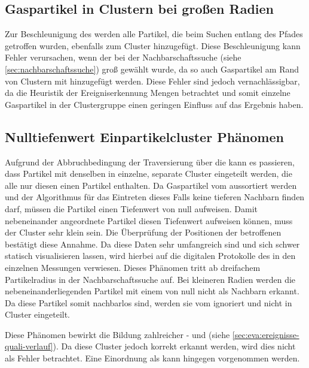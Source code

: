 \subsection*{Gaspartikel in Clustern bei großen Radien}

Zur Beschleunigung des \CFD werden alle Partikel, die beim Suchen entlang des Pfades getroffen wurden, ebenfalls zum Cluster hinzugefügt. Diese Beschleunigung kann Fehler verursachen, wenn der  bei der Nachbarschaftssuche (siehe \autoref{sec:nachbarschaftssuche}) groß gewählt wurde, da so auch Gaspartikel am Rand von Clustern mit hinzugefügt werden. Diese Fehler sind jedoch vernachlässigbar, da die Heuristik der Ereigniserkennung Mengen betrachtet und somit einzelne Gaspartikel in der Clustergruppe einen geringen Einfluss auf das Ergebnis haben.

\subsection*{Nulltiefenwert Einpartikelcluster Phänomen}\label{sec:nulltiefenwert-einpartikel-cluster} %

Aufgrund der Abbruchbedingung der Traversierung über die  kann es passieren, dass Partikel mit denselben  in einzelne, separate Cluster eingeteilt werden, die alle nur diesen einen Partikel enthalten. Da Gaspartikel vom \CFD aussortiert werden und der Algorithmus für das Eintreten dieses Falls keine tieferen Nachbarn finden darf, müssen die Partikel einen Tiefenwert von null aufweisen. Damit nebeneinander angeordnete Partikel diesen Tiefenwert aufweisen können, muss der Cluster sehr klein sein.
Die Überprüfung der Positionen der betroffenen  bestätigt diese Annahme. Da diese Daten sehr umfangreich sind und sich schwer statisch visualisieren lassen, wird hierbei auf die digitalen Protokolle des \CFD in den einzelnen Messungen verwiesen. %
Dieses Phänomen tritt ab dreifachem Partikelradius in der Nachbarschaftssuche auf. Bei kleineren Radien werden die nebeneinanderliegenden Partikel mit einem  von null nicht als Nachbarn erkannt. Da diese Partikel somit nachbarlos sind, werden sie vom \CFD ignoriert und nicht in Cluster eingeteilt.

Diese Phänomen bewirkt die Bildung zahlreicher - und  (siehe \autoref{sec:eva:ereignisse-quali-verlauf}). Da diese Cluster jedoch korrekt erkannt werden, wird dies nicht als Fehler betrachtet. Eine Einordnung als  kann hingegen vorgenommen werden.

